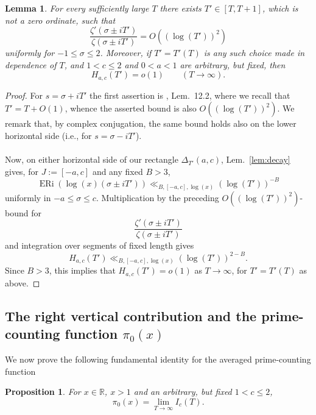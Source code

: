 \documentclass[a4paper,10pt]{amsart}
\DeclareMathOperator{\ERi}{ERi}
\newtheorem{lemma}[equation]{Lemma}
\newtheorem{proposition}[equation]{Proposition}
\theoremstyle{definition}
\numberwithin{equation}{section}
\def\R{\mathbb R}
\begin{document}
\begin{lemma}\label{lem:good}
For every sufficiently large $T$ there exists $T'\in[T,T+1]$, which is not a zero ordinate, such that
$$
\frac{\zeta'(\sigma\pm iT')}{\zeta(\sigma\pm iT')}=O((\log(T'))^2)
$$
uniformly for $-1\le\sigma\le2$.  Moreover, if $T'=T'(T)$ is any such choice made in dependence of $T$, and $1<c\le2$ and $0<a<1$ are arbitrary, but fixed, then
$$
H_{a,c}(T')=o(1)\qquad(T\to\infty).
$$
\end{lemma}

\begin{proof}
For $s=\sigma+ iT'$ the first assertion is \cite{MontgomeryVaughan}, Lem.\ 12.2, where we recall that $T'=T+O(1)$, whence the asserted bound is also $O((\log(T'))^2)$. We remark that, by complex conjugation, the same bound holds also on the lower horizontal side (i.e., for $s=\sigma- iT'$).\\\\ 
Now, on either horizontal side of our rectangle $\Delta_{T'}(a,c)$, Lem.\ \ref{lem:decay} gives, for $J:=[-a,c]$ and any fixed $B>3$,
$$
\ERi(\log(x)(\sigma\pm iT')) \ll_{B,[-a,c],\log(x)}(\log(T'))^{-B}
$$
uniformly in $-a\leq\sigma\leq c$. Multiplication by the preceding $O((\log(T'))^2)$-bound for
$$
\frac{\zeta'(\sigma\pm iT')}{\zeta(\sigma\pm iT')}
$$
and integration over segments of fixed length gives
$$
H_{a,c}(T') \ll_{B,[-a,c],\log(x)}(\log(T'))^{2-B}.
$$
Since $B>3$, this implies that $H_{a,c}(T')=o(1)$ as $T\to\infty$, for $T'=T'(T)$ as above.
\end{proof}


\subsection{The right vertical contribution and the prime-counting function $\pi_0(x)$}
We now prove the following fundamental identity for the averaged prime-counting function

\begin{proposition}\label{lem:right}
For $x\in\R$, $x>1$ and an arbitrary, but fixed $1<c\le2$, 
$$
\pi_0(x)=\displaystyle \lim_{T\to\infty}I_c(T).
$$
\end{proposition}
\end{document}
